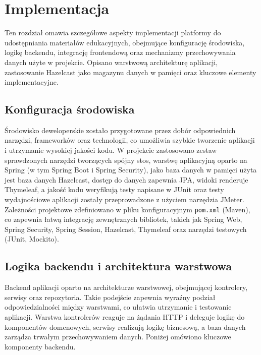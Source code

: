 \chapter{Implementacja} Ten rozdział omawia szczegółowe aspekty implementacji platformy do udostępniania materiałów edukacyjnych, obejmujące konfigurację środowiska, logikę backendu, integrację frontendową oraz mechanizmy przechowywania danych użyte w projekcie. Opisano warstwową architekturę aplikacji, zastosowanie Hazelcast jako magazynu danych w pamięci oraz kluczowe elementy implementacyjne. \section{Konfiguracja środowiska} Środowisko deweloperskie zostało przygotowane przez dobór odpowiednich narzędzi, frameworków oraz technologii, co umożliwia szybkie tworzenie aplikacji i utrzymanie wysokiej jakości kodu. W projekcie zastosowano zestaw sprawdzonych narzędzi tworzących spójny stos, warstwę aplikacyjną oparto na Spring (w tym Spring Boot i Spring Security), jako baza danych w pamięci użyta jest baza danych Hazelcast, dostęp do danych zapewnia JPA, widoki renderuje Thymeleaf, a jakość kodu weryfikują testy napisane w JUnit oraz testy wydajnościowe aplikacji zostały przeprowadzone z użyciem narzędzia JMeter.
Zależności projektowe zdefiniowano w pliku konfiguracyjnym \texttt{pom.xml} (Maven), co zapewnia łatwą integrację zewnętrznych bibliotek, takich jak Spring Web, Spring Security, Spring Session, Hazelcast, Thymeleaf oraz narzędzi testowych (JUnit, Mockito). 

\section{Logika backendu i architektura warstwowa} Backend aplikacji oparto na architekturze warstwowej, obejmującej kontrolery, serwisy oraz repozytoria. Takie podejście zapewnia wyraźny podział odpowiedzialności między warstwami, co ułatwia utrzymanie i testowanie aplikacji. Warstwa kontrolerów reaguje na żądania HTTP i deleguje logikę do komponentów domenowych, serwisy realizują logikę biznesową, a baza danych zarządza trwałym przechowywaniem danych. Poniżej omówiono kluczowe komponenty backendu. 

